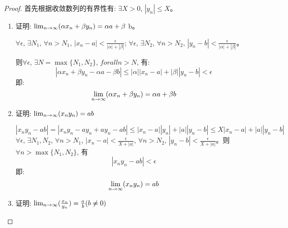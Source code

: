 \begin{proof}
    首先根据收敛数列的有界性有: $\exists X > 0$, $\left| y_n \right| \le X$。

    \begin{enumerate}
        \item 证明: $\lim_{n \to \infty } (\alpha x_n + \beta y_n) = \alpha a + \beta$ b。
        
        $\forall \epsilon$, $\exists N_1$, $\forall n > N_1$, $\left| x_n - a \right| < \frac{\epsilon}{|\alpha|+|\beta|}$; $\forall \epsilon$, $\exists N_2$, $\forall n > N_2$, $\left| y_n - b \right| < \frac{\epsilon}{|\alpha|+|\beta|}$。

        则$\forall \epsilon$, $\exists N = \max\{N_1, N_2\}$, $forall n > N$, 有:
        \begin{equation*}
            \left| \alpha x_n + \beta y_n - \alpha a - \beta b\right| \le |\alpha||x_n-a| + |\beta||y_n-b| < \epsilon
        \end{equation*}
        即:
        \begin{equation*}
            \lim_{n \to \infty } (\alpha x_n + \beta y_n) = \alpha a + \beta b
        \end{equation*}
        \item 证明: $\lim_{n \to \infty } (x_n y_n) = ab$
        
        \begin{equation*}
            | x_ny_n - ab | = |x_ny_n - ay_n +ay_n - ab| \le | x_n - a||y_n| + |a||y_n - b| \le X|x_n-a| +|a||y_n-b| 
        \end{equation*}
        $\forall \epsilon$, $\exists N_1, N_2$, $\forall n > N_1$, $|x_n - a| < \frac{\epsilon}{X+|a|}$, $\forall n > N_2$, $|y_n - b| < \frac{\epsilon}{X+|a|}$。则$\forall n > \max\{N_1, N_2\}$, 有
        \begin{equation*}
            | x_ny_n - ab | < \epsilon
        \end{equation*}
        即:
        \begin{equation*}
            \lim_{n \to \infty } (x_n y_n) = ab
        \end{equation*}
        \item 证明: $\lim_{n \to \infty } (\frac{x_n}{y_n}) = \frac{a}{b}(b \neq 0)$
        

\end{enumerate}
\end{proof}
